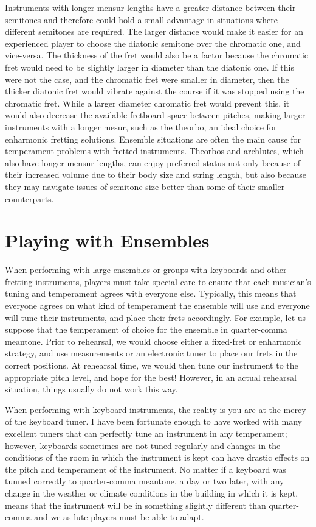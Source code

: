 Instruments with longer mensur lengths have a greater distance between their semitones and therefore
could hold a small advantage in situations where different semitones are required. The larger
distance would make it easier for an experienced player to choose the diatonic semitone over the
chromatic one, and vice-versa. The thickness of the fret would also be a factor because the
chromatic fret would need to be slightly larger in diameter than the diatonic one. If this were not
the case, and the chromatic fret were smaller in diameter, then the thicker diatonic fret would
vibrate against the course if it was stopped using the chromatic fret.  While a larger diameter
chromatic fret would prevent this, it would also decrease the available fretboard space between
pitches, making larger instruments with a longer mesur, such as the theorbo, an ideal choice for
enharmonic fretting solutions.  Ensemble situations are often the main cause for temperament
problems with fretted instruments.  Theorbos and archlutes, which also have longer mensur lengths,
can enjoy preferred status not only because of their increased volume due to their body size and
string length, but also because they may navigate issues of semitone size better than some of their
smaller counterparts.

\section{Playing with Ensembles}

When performing with large ensembles or groups with keyboards and other fretting instruments,
players must take special care to ensure that each musician's tuning and temperament agrees with
everyone else. Typically, this means that everyone agrees on what kind of temperament the ensemble
will use and everyone will tune their instruments, and place their frets accordingly.  For example,
let us suppose that the temperament of choice for the ensemble in quarter-comma meantone.  Prior to
rehearsal, we would choose either a fixed-fret or enharmonic strategy, and use measurements  or an
electronic tuner to place our frets in the correct positions.  At rehearsal time, we would then tune
our instrument to the appropriate pitch level, and hope for the best!  However, in an actual
rehearsal situation, things usually do not work this way.

When performing with keyboard instruments, the reality is you are at the mercy of the keyboard
tuner.  I have been fortunate enough to have worked with many excellent tuners that can perfectly
tune an instrument in any temperament; however, keyboards sometimes are not tuned regularly and
changes in the conditions of the room in which the instrument is kept can have drastic effects
on the pitch and temperament of the instrument.  No matter if a keyboard was tunned correctly to
quarter-comma meantone, a day or two later, with any change in the weather or climate conditions
in the building in which it is kept, means that the instrument will be in something slightly different
than quarter-comma and we as lute players must be able to adapt.

